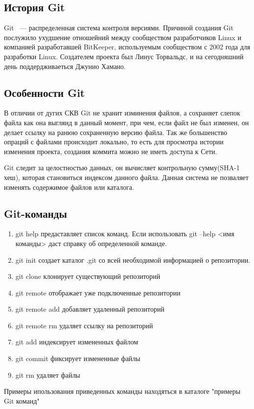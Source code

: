 \documentclass[14pt,a4paper]{article}
\begin{document}
\subsection{История Git}
Git \cite{wikiGit:website}~--- распределенная система контроля версиями.
Причиной создания Git послужило ухудшение отношейний между сообществом разработчиков Linux и компанией
разработавшей BitKeeper, используемым сообществом с 2002 года для разработки
Linux. Создателем проекта был Линус Торвальдс, и на сегодняшний день
поддердживаеться Джунио Хамано.
\subsection{Особенности Git}
В отличии от дугих СКВ Git не хранит изминения файлов, а сохраняет слепок файла
как она выгляид в данный момент, при чем, если файл не был изменен, он делает
ссылку на ранюю сохраненную версию файла. Так же большенство опраций с файлами
происходит локально, то есть для просмотра истории изменения проекта, создания
коммита можно не иметь доступа к Сети.

Git следит за целостностью данных, он вычисляет контрольную сумму(SHA-1 хеш),
которая становиться индексом данного файла. Данная система не позваляет изменять
содержимое файлов или каталога.
\subsection{Git-команды\cite{web:ProGit}}
\begin{enumerate}
  \item git help предаставляет список команд. Если использовать git
  --help <имя команды> даст справку об определенной команде.
  \item git init создает каталог .git со всей необходимой информацией о
  репозитории.
  \item git clone клонирует существующий репозиторий
  \item git remote отображает уже подключенные репозитории
  \item git remote add добавляет удаленный репозиторий
  \item git remote rm удаляет ссылку на репозиторий
  \item git add индексирует измененных файлом 
  \item git commit фиксирует измененные файлы
  \item git rm удаляет файлы
\end{enumerate}
Примеры ипользования приведенных команды находяться в каталоге "примеры Git
команд"
\newpage
\end{document}
